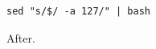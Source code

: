 \documentclass{article}
\begin{document}
\begin{verbatim}
sed "s/$/ -a 127/" | bash
\end{verbatim}
After.
\end{document}
